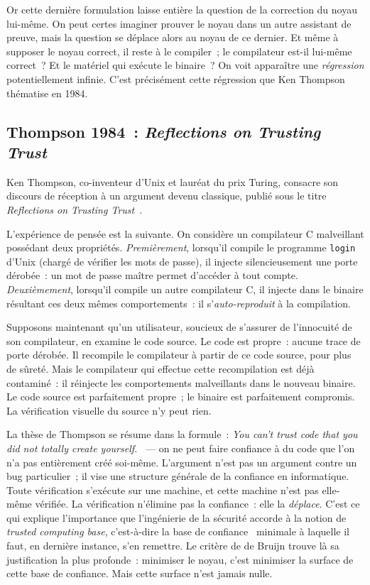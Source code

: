 \documentclass[11pt,a4paper]{article}
\begin{document}
Or cette dernière formulation laisse entière la question de la correction du noyau lui-même. On peut certes imaginer prouver le noyau dans un autre assistant de preuve, mais la question se déplace alors au noyau de ce dernier. Et même à supposer le noyau correct, il reste à le compiler~; le compilateur est-il lui-même correct~? Et le matériel qui exécute le binaire~? On voit apparaître une \emph{régression} potentiellement infinie. C'est précisément cette régression que Ken Thompson thématise en 1984.

\subsection{Thompson 1984~: \emph{Reflections on Trusting Trust}}

Ken Thompson, co-inventeur d'Unix et lauréat du prix Turing, consacre son discours de réception à un argument devenu classique, publié sous le titre \emph{Reflections on Trusting Trust}~\parencite{thompson1984trusting}.

L'expérience de pensée est la suivante. On considère un compilateur C malveillant possédant deux propriétés. \textit{Premièrement}, lorsqu'il compile le programme \texttt{login} d'Unix (chargé de vérifier les mots de passe), il injecte silencieusement une porte dérobée~: un mot de passe maître permet d'accéder à tout compte. \textit{Deuxièmement}, lorsqu'il compile un autre compilateur C, il injecte dans le binaire résultant ces deux mêmes comportements~: il s'\emph{auto-reproduit} à la compilation.

Supposons maintenant qu'un utilisateur, soucieux de s'assurer de l'innocuité de son compilateur, en examine le code source. Le code est propre~: aucune trace de porte dérobée. Il recompile le compilateur à partir de ce code source, pour plus de sûreté. Mais le compilateur qui effectue cette recompilation est déjà contaminé~: il réinjecte les comportements malveillants dans le nouveau binaire. Le code source est parfaitement propre~; le binaire est parfaitement compromis. La vérification visuelle du source n'y peut rien.

La thèse de Thompson se résume dans la formule~: \emph{\og You can't trust code that you did not totally create yourself.~\fg{}} --- on ne peut faire confiance à du code que l'on n'a pas entièrement créé soi-même. L'argument n'est pas un argument contre un bug particulier~; il vise une structure générale de la confiance en informatique. Toute vérification s'exécute sur une machine, et cette machine n'est pas elle-même vérifiée. La vérification n'élimine pas la confiance~: elle la \emph{déplace}. C'est ce qui explique l'importance que l'ingénierie de la sécurité accorde à la notion de \emph{trusted computing base}, c'est-à-dire la \og base de confiance~\fg{} minimale à laquelle il faut, en dernière instance, s'en remettre. Le critère de de Bruijn trouve là sa justification la plus profonde~: minimiser le noyau, c'est minimiser la surface de cette base de confiance. Mais cette surface n'est jamais nulle.
\end{document}
